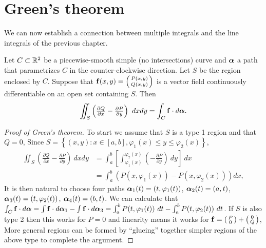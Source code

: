 \section{Green's theorem}

We can now establish a connection between multiple integrals and the line integrals of the previous chapter.

\begin{theorem}%
    \label{thm:greens}
    Let \(C\subset\mathbb{R}^2\) be a piecewise-smooth simple (no intersections) curve and \(\boldsymbol{\alpha}\) a path that parametrizes \(C\) in the counter-clockwise direction.
    Let \(S\) be the region enclosed by \(C\).
    Suppose that \(\mathbf{f}(x,y) = \left(\begin{smallmatrix}
            P(x,y) \\ Q(x,y)
        \end{smallmatrix}\right)\) is a vector field continuously differentiable  on an open set containing \(S\).
    Then
    \[
        \iint_{S} \left(\tfrac{\partial Q}{\partial x} - \tfrac{\partial P}{\partial y}\right) \ dx dy = \int_{C} \mathbf{f} \cdot d\boldsymbol{\alpha}.
    \]
\end{theorem}

\begin{proof}[Proof of Green's theorem]
    To start we assume that \(S\) is a type 1 region and that \(Q=0\),
    Since \(S = \left\{(x,y): x \in [a,b], \varphi_1(x) \leq y \leq \varphi_2(x)\right\}\),
    \[
        \begin{aligned}
            \iint_{S}  \left(\tfrac{\partial Q}{\partial x} - \tfrac{\partial P}{\partial y}\right) \ dx dy
             & =
            \int_{a}^{b}\left[\int_{\varphi_1(x)}^{\varphi_2(x)}  (- \tfrac{\partial P}{\partial y}) \ dy\right] \ dx \\
             & = \int_{a}^{b}  (P(x,\varphi_1(x))-P(x,\varphi_2(x)))   dx,
        \end{aligned}
    \]
    It is then natural to choose four paths \(\boldsymbol{\alpha}_1(t) = (t,\varphi_1(t))\), \(\boldsymbol{\alpha}_2(t) = (a,t)\), \(\boldsymbol{\alpha}_3(t) = (t,\varphi_2(t))\), \(\boldsymbol{\alpha}_4(t) = (b,t)\).
    We can calculate that
    \(\int_{C} \mathbf{f} \cdot d\boldsymbol{\alpha} = \int \mathbf{f} \cdot d\boldsymbol{\alpha}_1 - \int \mathbf{f} \cdot d\boldsymbol{\alpha}_3 = \int_{a}^{b} P(t,\varphi_1(t)) \ dt -  \int_{a}^{b} P(t,\varphi_2(t)) \ dt \).
    If \(S\) is also type 2 then this works for \(P=0\) and linearity means it works for \(\mathbf{f} = \left(\begin{smallmatrix}
            P \\ 0
        \end{smallmatrix}\right)+\left(\begin{smallmatrix}
            0 \\ Q
        \end{smallmatrix}\right)\),
    More general regions can be formed by ``glueing'' together simpler regions of the above type to complete the argument.
\end{proof}

